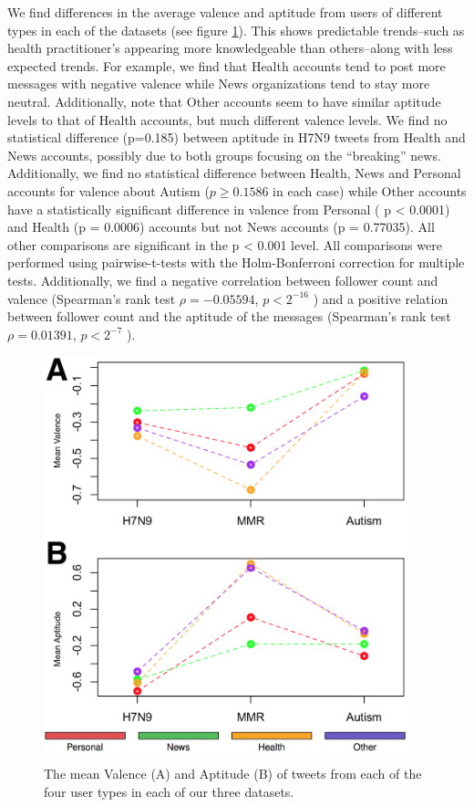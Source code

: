 We find differences in the average valence and aptitude from users of different types in each of the datasets (see figure \ref{fig:user_emotion}). This shows predictable trends--such as health practitioner's appearing more knowledgeable than others--along with less expected trends. For example, we find that Health accounts tend to post more messages with negative valence while News organizations tend to stay more neutral. Additionally, note that Other accounts seem to have similar aptitude levels to that of Health accounts, but much different valence levels. We find no statistical difference (p=0.185) between aptitude in H7N9 tweets from Health and News accounts, possibly due to both groups focusing on the ``breaking'' news. Additionally, we find no statistical difference between Health, News and Personal accounts for valence about Autism (\(p\geq 0.1586\) in each case) while Other accounts have a statistically significant difference in valence from Personal ( p < 0.0001) and Health (p = 0.0006) accounts but not News accounts (p = 0.77035). All other comparisons are significant in the p < 0.001 level. All comparisons were performed using pairwise-t-tests with the Holm-Bonferroni correction for multiple tests. Additionally, we find a negative correlation between follower count and valence (Spearman's rank test \(\rho = -0.05594\), \(p < 2^{-16}\) ) and a positive relation between follower count and the aptitude of the messages (Spearman's rank test \(\rho = 0.01391\), \(p < 2^{-7}\) ).


\begin{figure}
\centering
\includegraphics[width=0.95\textwidth]{retweets/figures/user_emotion_dataset.png}
\caption{The mean Valence (A) and Aptitude (B) of tweets from each of the four user types in each of our three datasets. }
\label{fig:user_emotion}
\end{figure}


